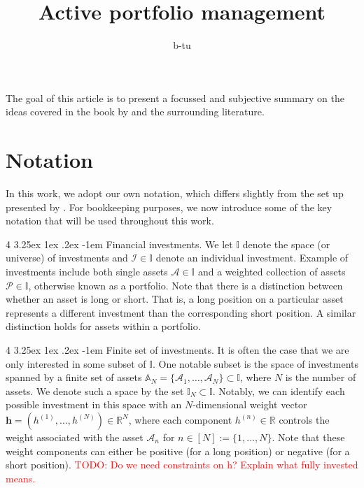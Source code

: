 \documentclass[12pt]{article}
\title{Active portfolio management}
\author{
	b-tu
}
\makeatletter
\renewcommand\paragraph{%
	\@startsection{paragraph}
	{4}
	{\z@}
	{3.25ex \@plus1ex \@minus.2ex}
	{-1em}
	{\normalfont\normalsize\bfseries\maybe@addperiod}%
}
\newcommand{\maybe@addperiod}[1]{%
	#1\@addpunct{.}%
}
\makeatother
\begin{document}
\maketitle
The goal of this article is to present a focussed and subjective summary on the ideas covered in the book by \cite{grinold1999} and the surrounding literature.
\section{Notation}
In this work, we adopt our own notation, which differs slightly from the set up presented by \cite{grinold1999}. For bookkeeping purposes, we now introduce some of the key notation that will be used throughout this work.

\paragraph{Financial investments.} We let $\mathbb{I}$ denote the space (or universe) of investments and $\mathcal{I} \in \mathbb{I}$ denote an individual investment. Example of investments include both single assets $\mathcal{A} \in \mathbb{I}$ and a weighted collection of assets $\mathcal{P} \in \mathbb{I}$, otherwise known as a portfolio. Note that there is a distinction between whether an asset is long or short. That is, a long position on a particular asset represents a different investment than the corresponding short position. A similar distinction holds for assets within a portfolio.

\paragraph{Finite set of investments.} It is often the case that we are only interested in some subset of $\mathbb{I}$. One notable subset is the space of investments spanned by a finite set of assets $\mathbb{A}_N = \{\mathcal{A}_1, \dots, \mathcal{A}_N\} \subset \mathbb{I}$, where $N$ is the number of assets. We denote such a space by the set $\mathbb{I}_{N} \subset \mathbb{I}$. Notably, we can identify each possible investment in this space with an $N$-dimensional weight vector $\mathbf{h} = (h^{(1)}, \dots, h^{(N)}) \in \mathbb{R}^N$, where each component $h^{(n)} \in \mathbb{R}$ controls the weight associated with the asset $\mathcal{A}_n$ for $n \in [N] := \{1,\dots,N\}$. Note that these weight components can either be positive (for a long position) or negative (for a short position). \textcolor{red}{TODO: Do we need constraints on h? Explain what fully invested means.}
\end{document}
